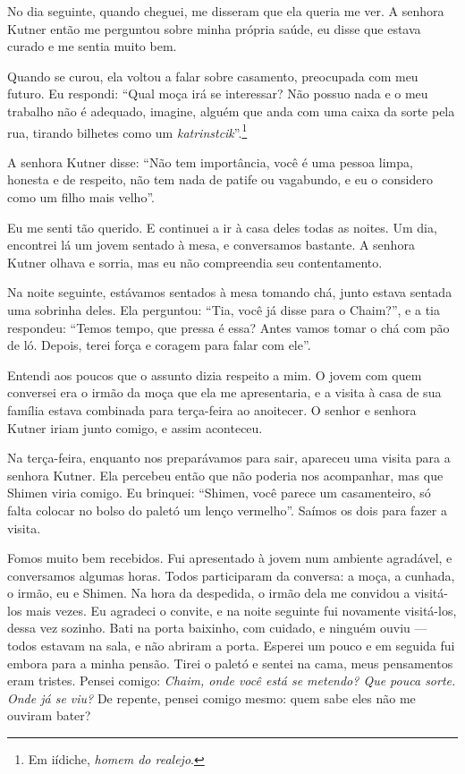 No dia seguinte, quando cheguei, me disseram que 
ela queria me ver. A senhora Kutner então me perguntou sobre
minha própria saúde, eu disse que estava curado e me sentia muito bem.

Quando se curou, ela voltou a falar sobre casamento,
preocupada com meu futuro. Eu respondi: ``Qual moça irá se
interessar? Não possuo nada e o meu trabalho não é adequado, imagine,
alguém que anda com uma caixa da sorte pela rua, tirando bilhetes como
um \textit{katrinstcik}''.\footnote{Em iídiche, \textit{homem do realejo}.}

A senhora Kutner disse: ``Não tem importância, você é uma pessoa
limpa, honesta e de respeito, não tem nada de patife ou vagabundo, e eu o
considero como um filho mais velho''.

Eu me senti tão querido. E continuei a ir à casa deles todas as noites.
Um dia, encontrei lá um jovem sentado à mesa, e conversamos bastante. A
senhora Kutner olhava e sorria, mas eu não compreendia seu contentamento.

Na noite seguinte, estávamos sentados à mesa tomando chá, junto estava
sentada uma sobrinha deles. Ela perguntou: ``Tia, você já disse para o
Chaim?'', e a tia respondeu: ``Temos tempo, que pressa é essa?
Antes vamos tomar o chá com pão de ló. Depois, terei força e coragem para
falar com ele''.

Entendi aos poucos que o assunto dizia respeito a mim. O jovem com quem conversei
era o irmão da moça que ela me apresentaria, e a visita à casa de sua família
estava combinada para terça-feira ao anoitecer. O senhor e senhora Kutner iriam junto
comigo, e assim aconteceu.

Na terça-feira, enquanto nos preparávamos para sair, apareceu uma visita para a
senhora Kutner. Ela percebeu então que não poderia nos acompanhar, mas
que Shimen viria comigo. Eu brinquei: ``Shimen, você
parece um casamenteiro, só falta colocar no bolso do paletó um lenço
vermelho''. Saímos os dois para fazer a visita.

Fomos muito bem recebidos. Fui apresentado à jovem num ambiente
agradável, e conversamos algumas horas. Todos participaram da conversa: a
moça, a cunhada, o irmão, eu e Shimen. Na hora da despedida, o irmão
dela me convidou a visitá-los mais vezes. Eu agradeci o convite, e na noite 
seguinte fui novamente visitá-los, dessa vez sozinho. Bati
na porta baixinho, com cuidado, e ninguém ouviu --- todos
estavam na sala, e não abriram a porta. Esperei um pouco e em seguida fui embora
para a minha pensão. Tirei o paletó e sentei na cama, meus pensamentos eram tristes. 
Pensei comigo: \textit{Chaim, onde você está se
metendo? Que pouca sorte. Onde já se viu?} De repente, pensei comigo mesmo: 
quem sabe eles não me ouviram bater?

